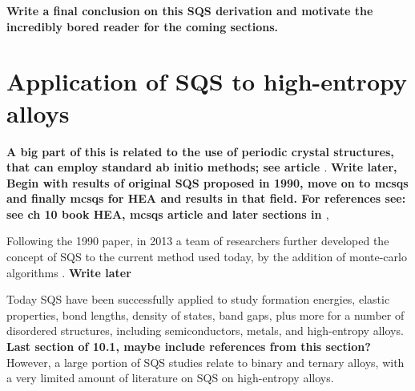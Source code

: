 \textbf{Write a final conclusion on this SQS derivation and motivate the incredibly bored reader for the coming sections.} 

\section{Application of SQS to high-entropy alloys}
\textbf{A big part of this is related to the use of periodic crystal structures, that can employ standard ab initio methods; see article \cite{sqsfull}}.
\textbf{Write later, Begin with results of original SQS proposed in 1990, move on to mcsqs and finally mcsqs for HEA and results in that field. For references see: 
see ch 10 book HEA, mcsqs article and later sections in \cite{sqsfull}}, \cite{hea2016_ch10}

Following the 1990 paper, in 2013 a team of researchers further developed the concept of SQS to the current method used today, by the addition of monte-carlo algorithms \cite{mcsqs2013}. \textbf{Write later}

Today SQS have been successfully applied to study formation energies, elastic properties, bond lengths, density of states, band gaps, plus more for a number of disordered structures, including semiconductors, metals, and high-entropy alloys. \textbf{Last section of 10.1, maybe include references from this section?} However, a large portion of SQS studies relate to binary and ternary alloys, with a very limited amount of literature on SQS on high-entropy alloys. 